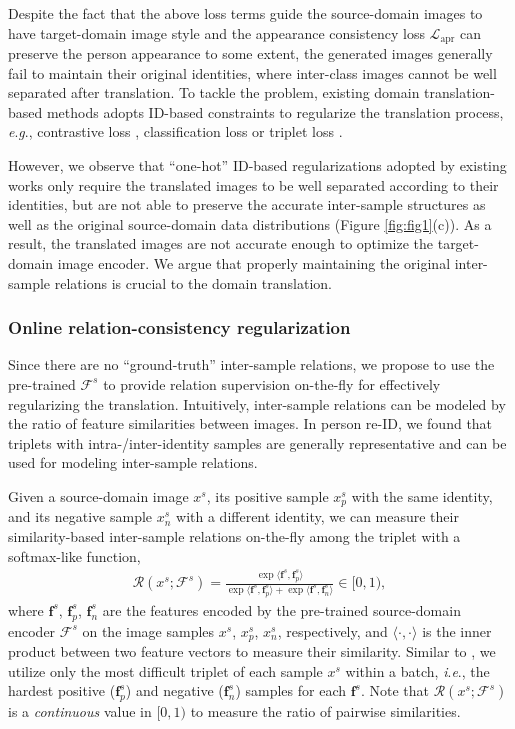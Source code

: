 \documentclass[journal]{IEEEtran}
\def\vf{{\bm{f}}}
\newcommand{\ie}{\textit{i}.\textit{e}., }
\newcommand{\eg}{\textit{e}.\textit{g}., }
\begin{document}
Despite the fact that the above loss terms guide the source-domain images to have target-domain image style and the appearance consistency loss  $\mathcal{L}_\text{apr}$ can preserve the person appearance to some extent,
the generated images generally fail to maintain their original identities, where inter-class images cannot be well separated after translation.
To tackle the problem, existing domain translation-based methods adopts ID-based constraints to regularize the translation process, \eg contrastive loss \cite{deng2018image}, classification loss \cite{deng2018similarity,chen2019instance,zou2020joint} or triplet loss \cite{tang2020cgan}.

However, we observe that ``one-hot'' ID-based regularizations adopted by existing works \cite{deng2018image,wei2018person,deng2018similarity,chen2019instance,zou2020joint,tang2020cgan}  {only require the translated images to be well separated according to their identities, but} are not able to preserve the accurate inter-sample structures as well as the original source-domain data distributions (Figure \ref{fig:fig1}(c)).
As a result, the translated images are not accurate enough to optimize the target-domain image encoder.
We argue that properly maintaining the original inter-sample relations is crucial to the domain translation.


\subsubsection{\textbf{Online relation-consistency regularization}}
Since there are no ``ground-truth'' inter-sample relations,
we propose to use the pre-trained $\mathcal{F}^s$ to provide relation supervision on-the-fly for effectively regularizing the translation.
Intuitively, inter-sample relations can be modeled by the ratio of feature similarities between images.
In person re-ID, we found that triplets with intra-/inter-identity samples are generally representative and can be used for modeling inter-sample relations.

Given a source-domain image $x^s$, its positive sample $x^s_p$ with the same identity, and its negative sample $x^s_n$ with a different identity,
we can measure their similarity-based inter-sample relations on-the-fly among the triplet with a softmax-like function,
{
\begin{align}
\mathcal{R}(x^s; \mathcal{F}^s)=\frac{\exp \langle \vf^s, \vf^s_p\rangle}
{\exp \langle \vf^s, \vf^s_p\rangle + \exp \langle \vf^s, \vf^s_n \rangle} \in [0,1),
\label{eq:rel_s}
\end{align}}where $\vf^s$, $\vf_p^s$, $\vf_n^s$ are the features encoded by the pre-trained source-domain encoder $\mathcal{F}^s$ on the image samples $x^s$, $x_p^s$, $x_n^s$, respectively, and $\langle \cdot, \cdot \rangle$ is the inner product between two feature vectors to measure their similarity.
Similar to \cite{hermans2017defense}, we utilize only the most difficult triplet of each sample $x^s$ within a batch, \ie the hardest positive ($\vf^s_p$) and negative ($\vf^s_n$) samples for each $\vf^s$. Note that $\mathcal{R}(x^s; \mathcal{F}^s)$ is a \emph{continuous} value in $[0,1)$ to measure the ratio of pairwise similarities.
\end{document}
